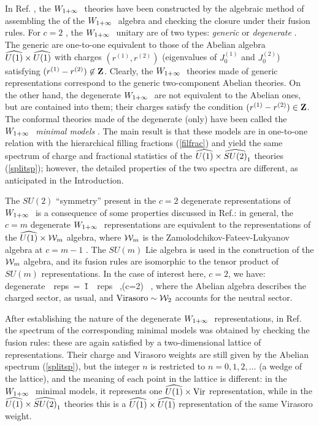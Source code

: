 In Ref. \cite{ctz5}, the $W_{1+\infty}\ $ theories have been constructed by 
the algebraic method of assembling the \reps of the $W_{1+\infty}\ $ algebra 
and checking the closure under their fusion rules.
For $c=2$ , the $W_{1+\infty}\ $ unitary \reps are of
two types: {\it generic} or {\it degenerate} \cite{kac}.
The generic \reps are one-to-one equivalent to those
of the Abelian algebra $\u1\times\u1$ with charges 
$(r^{(1)}, r^{(2)})$ (eigenvalues of $J^{(1)}_0$ and $J^{(2)}_0$)
satisfying $(r^{(1)} - r^{(2)}) \not\in {\bf Z}$.
Clearly, the $W_{1+\infty}\ $ theories made of generic representations
correspond to the generic two-component Abelian theories.
On the other hand, the degenerate $W_{1+\infty}\ $ \reps are not equivalent
to the Abelian ones, but are contained into them;
their charges satisfy the condition 
$(r^{(1)} - r^{(2)}) \in {\bf Z}$.
The conformal theories made of the degenerate \reps (only)
have been called the {\it $W_{1+\infty}\ $ minimal models} \cite{ctz5}.
The main result is that these models are in one-to-one
relation with the hierarchical filling fractions (\ref{filfrac}) 
and yield the same spectrum of charge and fractional statistics
of the $\u1\times\su2$ theories (\ref{splitsp}); 
however, the detailed properties of the two spectra are different,
as anticipated in the Introduction.

The $SU(2)$ ``symmetry'' present in the $c=2$ degenerate 
representations of $W_{1+\infty}\ $ is a consequence of some properties discussed in 
Ref.\cite{kac}: in general, the $c=m$ degenerate $W_{1+\infty}\ $ representations 
are equivalent to the representations of the 
$\u1\times{\cal W}_m$ algebra, where ${\cal W}_m$
is the Zamolodchikov-Fateev-Lukyanov algebra at
$c=m-1$ \cite{fz}. The $SU(m)$ Lie algebra is used 
in the construction of the ${\cal W}_m$  algebra, and its
fusion rules are isomorphic to the tensor product of $SU(m)$ representations.
In the case of interest here, $c=2$, we have: 
\beq
{\rm degenerate}\ \winf\ {\rm reps}\ =\ 
\u1\ \ {\rm reps} \ ,\qquad\qquad (c=2) \ ,
\eeq
where the Abelian algebra describes the charged sector, as usual, 
and ${\rm Virasoro}\sim{\cal W}_2$ accounts for the neutral sector.

After establishing the nature of the degenerate $W_{1+\infty}\ $
representations, in Ref. \cite{ctz5} the spectrum of the
corresponding minimal models was obtained by checking the fusion
rules: these are again satisfied by a two-dimensional lattice of 
representations.
Their charge and Virasoro weights are still given by the Abelian
spectrum (\ref{splitsp}), but the integer $n$ is restricted to 
$n=0,1,2,\dots$ (a wedge of the lattice), and the meaning of each point in the
lattice is different: in the $W_{1+\infty}\ $ minimal models,
it represents one $\u1\times{\rm Vir}$ 
representation, while in the $\u1\times\su2$ theories this is a $\u1\times\u1$ 
representation of the same Virasoro weight.


